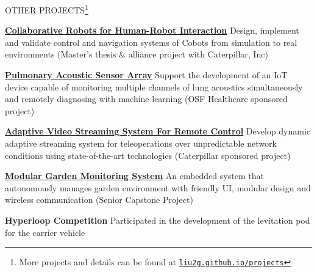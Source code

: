 \documentclass{lib/resume} %
\begin{document}
\begin{rSection}{OTHER PROJECTS\footnote{More projects and details can be found at \href{https://liu2g.github.io/projects}{\nolinkurl{liu2g.github.io/projects}}}}
    \vspace{-1em}
    \item \href{https://liu2g.github.io/thesis/}{\textbf{Collaborative Robots for Human-Robot Interaction}} Design, implement and validate control and navigation systems of Cobots from simulation to real environments (Master's thesis \& alliance project with Caterpillar, Inc)
    \item \href{https://liu2g.github.io/pasta/}{\textbf{Pulmonary Acoustic Sensor Array}} Support the development of an IoT device capable of monitoring multiple channels of lung acoustics simultaneously and remotely diagnosing with machine learning (OSF Healthcare sponsored project)
    \item \href{https://liu2g.github.io/teleop-video/}{\textbf{Adaptive Video Streaming System For Remote Control}} {Develop dynamic adaptive streaming system for teleoperations over unpredictable network conditions using state-of-the-art technologies (Caterpillar sponsored project)}
    \item \href{https://github.com/liu2g/mgms}{\textbf{Modular Garden Monitoring System}} {An embedded system that autonomously manages garden environment with friendly UI, modular design and wireless communication (Senior Capstone Project)}
    \item \textbf{Hyperloop Competition} {Participated in the development of the levitation pod for the carrier vehicle}

\end{rSection}
\end{document}
